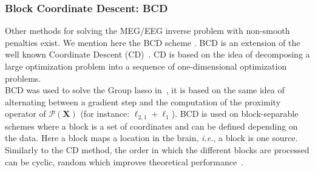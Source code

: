 

\subsubsection*{Block Coordinate Descent: BCD} \label{section:BCD}
Other methods for solving the MEG/EEG inverse problem with non-smooth penalties exist. We mention here the \ac{BCD} scheme \cite{tseng2010approximation}. BCD is an extension of the well known Coordinate Descent (CD)~\cite{li-osher:2009,nesterov2012efficiency}. CD is based on the idea of decomposing a large optimization problem into a sequence of one-dimensional optimization problems. \\

BCD was used to solve the Group \ac{lasso} in~\cite{rakotomamonjy2011surveying,qin2013efficient}, it is based on the same idea of alternating between a gradient step and the computation of the proximity operator of $\mathcal{P}(\mathbf{X})$ (for instance: $\ell_{2,1}+\ell_1$). BCD is used on block-separable schemes where a block is a set of coordinates and can be defined depending on the data. Here a block maps a location in the brain, \textit{i.e.}, a block is one source. Similarly to the CD method, the order in which the different blocks are processed can be cyclic, random which improves theoretical performance~\cite{tseng2001convergence,wei2012doa}. \\

